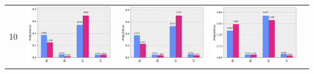 \documentclass[11pt]{article}
\begin{document}
\begin{table}[h!]
\begin{tabular}{| c | c | c | c | c | }
\begin{minipage}{.215\textwidth}
      \end{minipage}
      \\ \hline
      10 & 
      \begin{minipage}{.215\textwidth}
        \includegraphics[width=\linewidth]{img/qecc3_X10.png}
      \end{minipage}&
      \begin{minipage}{.215\textwidth}
        \includegraphics[width=\linewidth]{img/qecc3_Y10.png}
      \end{minipage}
      &\begin{minipage}{.215\textwidth}
        \includegraphics[width=\linewidth]{img/qecc3_Z10.png}

\end{minipage}
\end{tabular}
\end{table}
\end{document}
